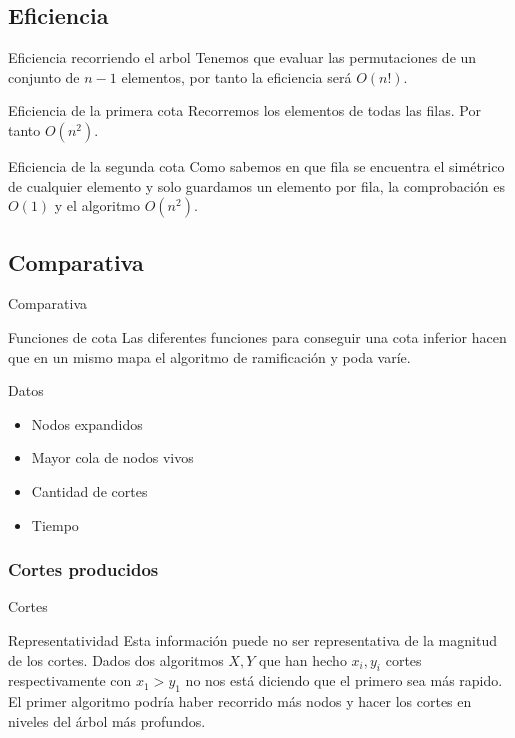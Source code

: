 \subsection{Eficiencia}
\begin{frame}
	\begin{block}{Eficiencia recorriendo el arbol}
	Tenemos que evaluar las permutaciones de un conjunto de $n-1$ elementos, por tanto la eficiencia será $O(n!)$.
	\end{block}
	
	\begin{block}{Eficiencia de la primera cota}
		Recorremos los elementos de todas las filas. Por tanto $O(n^2)$.
	\end{block}
	
	\begin{block}{Eficiencia de la segunda cota}
		Como sabemos en que fila se encuentra el simétrico de cualquier elemento y solo guardamos un elemento por fila, la comprobación es $O(1)$ y el algoritmo $O(n^2)$.
	\end{block}

\end{frame}


\subsection{Comparativa}
\begin{frame}{Comparativa}
	\begin{block}{Funciones de cota}
	Las diferentes funciones para conseguir una cota inferior hacen que en un mismo mapa
	el algoritmo de ramificación y poda varíe. 
	\end{block}
	
	\begin{exampleblock}{Datos}
	\begin{itemize}
		\item Nodos expandidos
		\item Mayor cola de nodos vivos
		\item Cantidad de cortes
		\item Tiempo
	\end{itemize}
	\end{exampleblock}
\end{frame}



\subsubsection{Cortes producidos}
\begin{frame}{Cortes}
	\begin{block}{Representatividad}
	Esta información puede no ser representativa de la
	magnitud de los cortes. Dados dos algoritmos $X,Y$ que han hecho $x_i,y_i$ cortes
	respectivamente con $x_1>y_1$ no nos está diciendo que el primero sea más rapido.
	El primer algoritmo podría haber recorrido más nodos y hacer los cortes en niveles 
	del árbol más profundos. 
	\end{block}
\end{frame}
 
